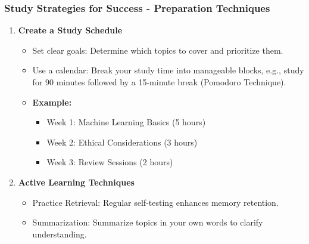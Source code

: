 \documentclass[aspectratio=169]{beamer}
\begin{document}
\begin{frame}[fragile]
    \frametitle{Study Strategies for Success - Preparation Techniques}
    \begin{enumerate}
        \item \textbf{Create a Study Schedule}
        \begin{itemize}
            \item Set clear goals: Determine which topics to cover and prioritize them.
            \item Use a calendar: Break your study time into manageable blocks, e.g., study for 90 minutes followed by a 15-minute break (Pomodoro Technique).
            \item \textbf{Example:}
            \begin{itemize}
                \item Week 1: Machine Learning Basics (5 hours)
                \item Week 2: Ethical Considerations (3 hours)
                \item Week 3: Review Sessions (2 hours)
            \end{itemize}
        \end{itemize}
        
        \item \textbf{Active Learning Techniques}
            \begin{itemize}
                \item Practice Retrieval: Regular self-testing enhances memory retention. 
                \item Summarization: Summarize topics in your own words to clarify understanding.
            \end{itemize}
    \end{enumerate}
\end{frame}
\end{document}
